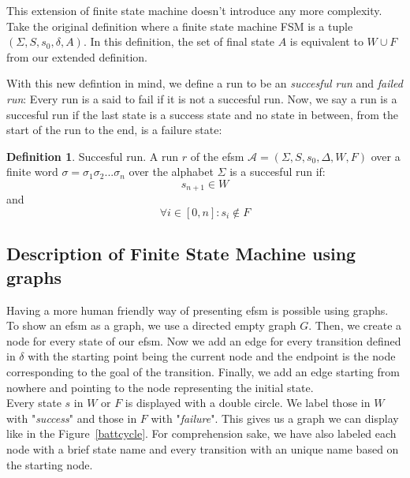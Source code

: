 \documentclass[12pt]{article}
\theoremstyle{definition}
\newtheorem{definition}{Definition}[section]
\theoremstyle{definition}
\theoremstyle{remark}
\newcommand{\A}{\mathcal{A}}
\begin{document}
This extension of finite state machine doesn't introduce any more complexity. Take the original definition where a finite state machine FSM is a tuple $(\Sigma, S, s_{0},\delta, A)$. In this definition, the set of final state $A$ is equivalent to $W \cup F$ from our extended definition.

With this new defintion in mind, we define a run to be an \textit{succesful run} and \textit{failed run}: Every run is a said to fail if it is not a succesful run. Now, we say a run is a succesful run if the last state is a success state and no state in between, from the start of the run to the end, is a failure state:

\theoremstyle{definition}
\begin{definition}{Succesful run.} A run $r$ of the \gls{efsm} $\A = (\Sigma, S, s_{0}, \Delta, W, F)$ over a finite word $\sigma = \sigma_1 \sigma_2 ... \sigma_n$ over the alphabet $\Sigma$ is a succesful run if:
$$s_{n+1} \in W$$ and $$\forall i \in [0, n]: s_{i} \notin F$$
\end{definition}



\subsection{Description of Finite State Machine using graphs}

Having a more human friendly way of presenting \gls{efsm} is possible using graphs. To show an \gls{efsm} as a graph, we use a directed empty graph $G$. Then, we create a node for every state of our \gls{efsm}. Now we add an edge for every transition defined in $\delta$ with the starting point being the current node and the endpoint is the node corresponding to the goal of the transition. Finally, we add an edge starting from nowhere and pointing to the node representing the initial state.\\

Every state $s$ in $W$ or $F$ is displayed with a double circle. We label those in $W$ with "\textit{success}" and those in $F$ with "\textit{failure}". This gives us a graph we can display like in the Figure~\ref{battcycle}. For comprehension sake, we have also labeled each node with a brief state name and every transition with an unique name based on the starting node.
\end{document}
